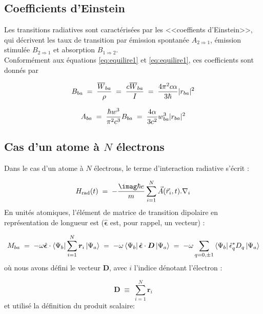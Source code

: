     \subsection{Coefficients d'Einstein}



Les transitions radiatives sont caractérisées par les <<coeffients d'Einstein>>, qui décrivent les taux de transition par émission spontanée $A_{2\Rightarrow1}$, émission stimulée $B_{2\Rightarrow 1}$ et absorption $B_{1\Rightarrow2}$.\\
Conformément aux équations \eqref{eq:equilire1} et \eqref{eq:equilire1}, ces coefficients sont donnés par

\begin{equation}
    B_{ba}\; = \; \dfrac{\overline{W}_{ba}}{\rho}\; = \; \dfrac{c\overline{W}_{ba}}{I}\; = \; \dfrac{4\pi^2 c \alpha}{3 \hbar}|r_{ba}|^2
\end{equation}

\begin{equation}
    A_{ba}\; = \; \dfrac{\hbar w^3}{\pi^2 c^3}B_{ba}\; = \; \dfrac{4 \alpha}{3 c^2}w_{ba}^3|r_{ba}|^2
\end{equation}





\subsection{Cas d'un atome à $N$ électrons}

Dans le cas d'un atome à $N$ électrons, le terme d'interaction radiative s'écrit :

\begin{equation}
    H_\text{rad}(t)\eq -\dfrac{\imag\hbar e}{m}\sum_{i=1}^{N} \vec{A}(\vec{r}_i,t).\nabla_i
\end{equation}
En unités atomiques, l'élément de matrice de transition dipolaire en représentation de longueur est ($\hat{\bm{\epsilon}}$ est, pour rappel, un vecteur) :

\begin{equation}
    M_{ba} \; = \;
    -\omega \hat{\bm{\epsilon}}\cdot\bra{\Psi_b}\sum_{i=1}^{N} \bm{r}_i\ket{\Psi_a}
    \; = \;
    -\omega \bra{\Psi_b}\hat{\bm{\epsilon}} \cdot \bm{D}\ket{\Psi_a}
    \; = \;
    -\omega \sum_{q=0,\pm 1}\bra{\Psi_b}\hat{\epsilon}_q^* D_q\ket{\Psi_a}
\end{equation}
où nous avons défini le vecteur $\bm{D}$, avec $i$ l'indice dénotant l'électron :

\[
    \bm{D} \;\equiv\; \sum_{i=1}^N \bm{r}_i
\]
et utilisé la définition du produit scalaire:

